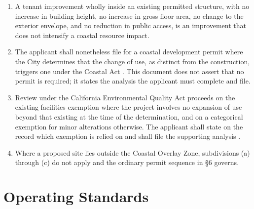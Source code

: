 \begin{enumerate}
\item A tenant improvement wholly inside an existing permitted structure, with
  no increase in building height, no increase in gross floor area, no change to
  the exterior envelope, and no reduction in public access, is an improvement
  that does not intensify a coastal resource impact.

\item The applicant shall nonetheless file for a coastal development permit
  where the City determines that the change of use, as distinct from the
  construction, triggers one under the Coastal Act \cite{coastalact}. This
  document does not assert that no permit is required; it states the analysis
  the applicant must complete and file.

\item Review under the California Environmental Quality Act proceeds on the
  existing facilities exemption where the project involves no expansion of use
  beyond that existing at the time of the determination, and on a categorical
  exemption for minor alterations otherwise. The applicant shall state on the
  record which exemption is relied on and shall file the supporting analysis
  \cite{ceqa}.

\item Where a proposed site lies outside the Coastal Overlay Zone, subdivisions
  (a) through (c) do not apply and the ordinary permit sequence in §6 governs.
\end{enumerate}

\section{Operating Standards}

